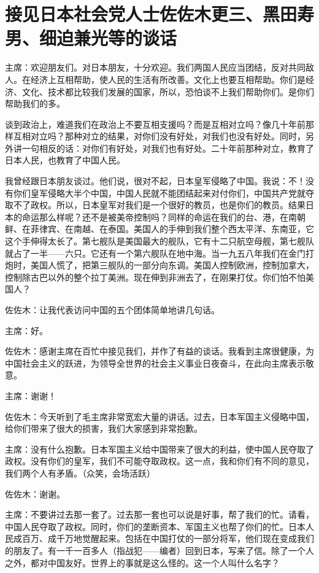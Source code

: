 \section[接见日本社会党人士佐佐木更三、黑田寿男、细迫兼光等的谈话（一九六四年七月十日）]{接见日本社会党人士佐佐木更三、黑田寿男、细迫兼光等的谈话}


主席：欢迎朋友们。对日本朋友，十分欢迎。我们两国人民应当团结，反对共同敌人。在经济上互相帮助，使人民的生活有所改善。文化上也要互相帮助。你们是经济、文化、技术都比较我们发展的国家，所以，恐怕谈不上我们帮助你们。是你们帮助我们的多。

谈到政治上，难道我们在政治上不要互相支援吗？而是互相对立吗？像几十年前那样互相对立吗？那种对立的结果，对你们没有好处，对我们也没有好处。同时，另外讲一句相反的话：对你们有好处，对我们也有好处。二十年前那种对立，教育了日本人民，也教育了中国人民。

我曾经跟日本朋友谈过。他们说，很对不起，日本皇军侵略了中国。我说：不！没有你们皇军侵略大半个中国，中国人民就不能团结起来对付你们，中国共产党就夺取不了政权。所以，日本皇军对我们是一个很好的教员，也是你们的教员。结果日本的命运那么样呢？还不是被美帝控制吗？同样的命运在我们的台、港，在南朝鲜、在菲律宾、在南越、在泰国。美国人的手伸到我们整个西太平洋、东南亚，它这个手伸得太长了。第七舰队是美国最大的舰队，它有十二只航空母舰，第七舰队就占了一半——六只。它还有一个第六舰队在地中海。当一九五八年我们在金门打炮时，美国人慌了，把第三舰队的一部分向东调。美国人控制欧洲，控制加拿大，控制除古巴以外的整个拉丁美洲。现在伸到非洲去了，在刚果打仗。你们怕不怕美国人？

佐佐木：让我代表访问中国的五个团体简单地讲几句话。

主席：好。

佐佐木：感谢主席在百忙中接见我们，并作了有益的谈话。我看到主席很健康，为中国社会主义的跃进，为领导全世界的社会主义事业日夜奋斗，在此向主席表示敬意。

主席：谢谢！

佐佐木：今天听到了毛主席非常宽宏大量的讲话。过去，日本军国主义侵略中国，给你们带来了很大的损害，我们大家感到非常抱歉。

主席：没有什么抱歉。日本军国主义给中国带来了很大的利益，使中国人民夺取了政权。没有你们的皇军，我们不可能夺取政权。这一点，我和你们有不同的意见，我们两个人有矛盾。（众笑，会场活跃）

佐佐木：谢谢。

主席：不要讲过去那一套了。过去那一套也可以说是好事，帮了我们的忙。请看，中国人民夺取了政权。同时，你们的垄断资本、军国主义也帮了你们的忙。日本人民成百万、成千万地觉醒起来。包括在中国打仗的一部分将军，他们现在变成我们的朋友了。有一千一百多人（指战犯——编者）回到日本，写来了信。除了一个人之外，都对中国友好。世界上的事就是这么怪的。这一个人叫什么名字？

